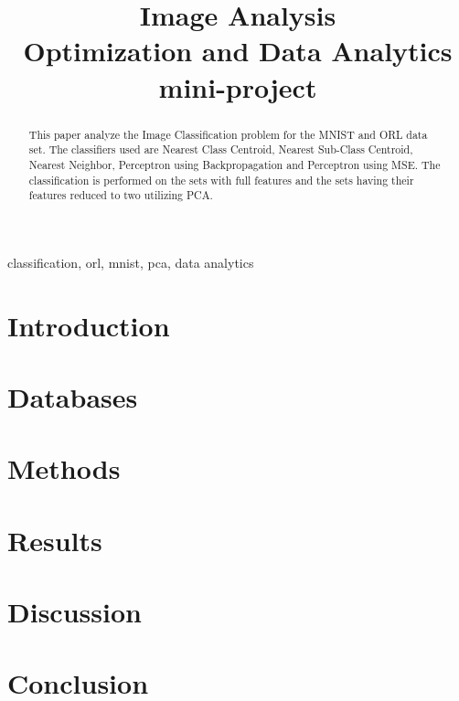 \documentclass[conference]{IEEEtran}
\begin{document}
\title{Image Analysis\\
{\footnotesize Optimization and Data Analytics mini-project}}

\author{
}

\maketitle

\begin{abstract}
This paper analyze the Image Classification problem for the MNIST and ORL data set. The classifiers used are Nearest Class Centroid, Nearest Sub-Class Centroid, Nearest Neighbor, Perceptron using Backpropagation and Perceptron using MSE. The classification is performed on the sets with full features and the sets having their features reduced to two utilizing PCA. 
\end{abstract}

\begin{IEEEkeywords}
classification, orl, mnist, pca, data analytics
\end{IEEEkeywords}

\section{Introduction}


\section{Databases}


\section{Methods}


\newpage
\section{Results}


\section{Discussion}


\section{Conclusion}



\printbibliography
\end{document}
